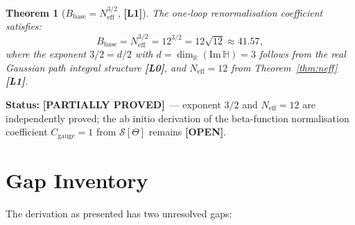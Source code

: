 \documentclass[11pt,a4paper]{article}
\newtheorem{theorem}{Theorem}
\theoremstyle{definition}
\theoremstyle{remark}
\newcommand{\Lzero}{\textbf{[L0]}}
\newcommand{\Lone}{\textbf{[L1]}}
\newcommand{\OPEN}{\textbf{[OPEN]}}
\newcommand{\PARTIAL}{\textbf{[PARTIALLY PROVED]}}
\begin{document}
\begin{theorem}[$B_{\mathrm{base}} = N_{\mathrm{eff}}^{3/2}$, {\Lone}]
  \label{thm:bbase}
  The one-loop renormalisation coefficient satisfies:
  \begin{equation}
    B_{\mathrm{base}}
    = N_{\mathrm{eff}}^{3/2}
    = 12^{3/2}
    = 12\sqrt{12}
    \approx 41.57,
  \end{equation}
  where the exponent $3/2 = d/2$ with $d = \dim_\mathbb{R}(\mathrm{Im}\,\mathbb{H}) = 3$
  follows from the real Gaussian path integral structure \Lzero,
  and $N_{\mathrm{eff}} = 12$ from Theorem~\ref{thm:neff} \Lone.
\end{theorem}

\textbf{Status:} \PARTIAL\ — exponent $3/2$ and $N_{\mathrm{eff}} = 12$
are independently proved; the ab initio derivation of the beta-function
normalisation coefficient $C_{\mathrm{gauge}} = 1$ from $\mathcal{S}[\Theta]$
remains \OPEN.


\section{Gap Inventory}
\label{sec:gaps}


The derivation as presented has two unresolved gaps:
\end{document}
